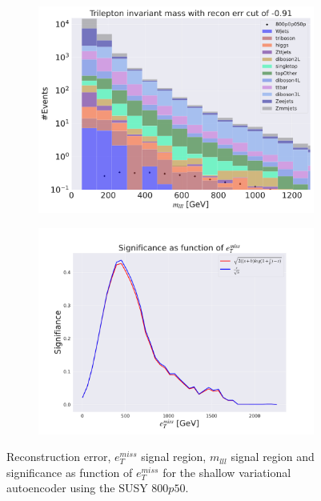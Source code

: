 \begin{figure}[H]
    \hfill
    \begin{subfigure}{.49\textwidth}
        \includegraphics[width=\textwidth]{Figures/VAE_testing/small/3lep/b_data_recon_big_rm3_feats_sig_800p0p050p_mlll_recon_errcut_-0.91.pdf}
        \caption{}
        \label{fig:VAE_3lep_small_mlll_800}
    \end{subfigure}
    \hfill   
    \begin{subfigure}{.49\textwidth}
        \includegraphics[width=\textwidth]{Figures/VAE_testing/small/3lep/significance_etmiss_800p0p050p_-0.9142561918890106.pdf}
        \caption{}
        \label{fig:VAE_3lep_small_signi_800}
    \end{subfigure}
    \hfill      
    \caption[3lep shallow network | $800p50$ | VAE]{Reconstruction error, $e_T^{miss}$ signal region, $m_{lll}$ signal region and significance as function of 
    $e_T^{miss}$ for the shallow variational autoencoder using the SUSY $800p50$.}
    \label{fig:VAE_3lep_small_rec_sig_signi_800}
\end{figure}


